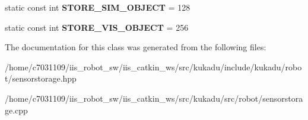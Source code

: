 \begin{DoxyCompactItemize}
\item 
\hypertarget{classkukadu_1_1SensorStorage_ad2b1ffec1c7466a22d0f4431ba987931}{static const int {\bfseries S\-T\-O\-R\-E\-\_\-\-S\-I\-M\-\_\-\-O\-B\-J\-E\-C\-T} = 128}\label{classkukadu_1_1SensorStorage_ad2b1ffec1c7466a22d0f4431ba987931}

\item 
\hypertarget{classkukadu_1_1SensorStorage_a041506263812ebe4d18bd0a7f780cef8}{static const int {\bfseries S\-T\-O\-R\-E\-\_\-\-V\-I\-S\-\_\-\-O\-B\-J\-E\-C\-T} = 256}\label{classkukadu_1_1SensorStorage_a041506263812ebe4d18bd0a7f780cef8}

\end{DoxyCompactItemize}


The documentation for this class was generated from the following files\-:\begin{DoxyCompactItemize}
\item 
/home/c7031109/iis\-\_\-robot\-\_\-sw/iis\-\_\-catkin\-\_\-ws/src/kukadu/include/kukadu/robot/sensorstorage.\-hpp\item 
/home/c7031109/iis\-\_\-robot\-\_\-sw/iis\-\_\-catkin\-\_\-ws/src/kukadu/src/robot/sensorstorage.\-cpp\end{DoxyCompactItemize}
